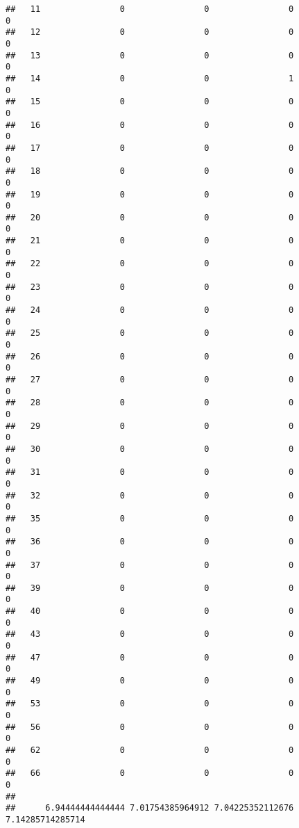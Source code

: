 \documentclass[]{article}
\begin{document}
\begin{verbatim}
##   11                0                0                0                0
##   12                0                0                0                0
##   13                0                0                0                0
##   14                0                0                1                0
##   15                0                0                0                0
##   16                0                0                0                0
##   17                0                0                0                0
##   18                0                0                0                0
##   19                0                0                0                0
##   20                0                0                0                0
##   21                0                0                0                0
##   22                0                0                0                0
##   23                0                0                0                0
##   24                0                0                0                0
##   25                0                0                0                0
##   26                0                0                0                0
##   27                0                0                0                0
##   28                0                0                0                0
##   29                0                0                0                0
##   30                0                0                0                0
##   31                0                0                0                0
##   32                0                0                0                0
##   35                0                0                0                0
##   36                0                0                0                0
##   37                0                0                0                0
##   39                0                0                0                0
##   40                0                0                0                0
##   43                0                0                0                0
##   47                0                0                0                0
##   49                0                0                0                0
##   53                0                0                0                0
##   56                0                0                0                0
##   62                0                0                0                0
##   66                0                0                0                0
##     
##      6.94444444444444 7.01754385964912 7.04225352112676 7.14285714285714

\end{verbatim}
\end{document}
